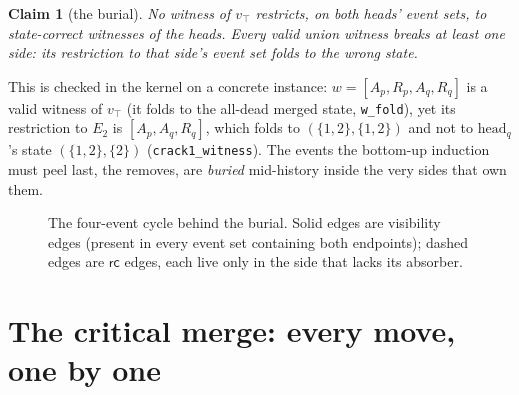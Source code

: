 \documentclass[11pt]{article}
\newtheorem{claim}[theorem]{Claim}
\newcommand{\vis}{\xrightarrow{\mathsf{vis}}}
\newcommand{\rcrel}{\mathsf{rc}}
\newcommand{\ncomm}{\not\rightleftarrows}
\newcommand{\lean}[1]{\texttt{#1}}
\newcommand{\Ap}{A_p}
\newcommand{\Aq}{A_q}
\newcommand{\Rp}{R_p}
\newcommand{\Rq}{R_q}
\begin{document}
\begin{claim}[the burial]
\label{claim:burial}
No witness of $v_\top$ restricts, on both heads' event sets, to
state-correct witnesses of the heads. Every valid union witness breaks
at least one side: its restriction to that side's event set folds to
the wrong state.
\end{claim}

This is checked in the kernel on a concrete instance:
$w = [\Ap, \Rp, \Aq, \Rq]$ is a valid witness of $v_\top$ (it folds to
the all-dead merged state, \lean{w\_fold}), yet its restriction to
$E_2$ is $[\Ap, \Aq, \Rq]$, which folds to $(\{1,2\},\{1,2\})$ and not
to $\mathrm{head}_q$'s state $(\{1,2\},\{2\})$
(\lean{crack1\_witness}). The events the bottom-up induction must peel
last, the removes, are \emph{buried} mid-history inside the very sides
that own them.

\begin{figure}[t]
\centering
{}
\caption{The four-event cycle behind the burial. Solid edges are
visibility edges (present in every event set containing both
endpoints); dashed edges are $\rcrel$ edges, each live only in the side
that lacks its absorber.}
\label{fig:cycle}
\end{figure}

\section{The critical merge: every move, one by one}
\label{sec:exhaust}
\end{document}
